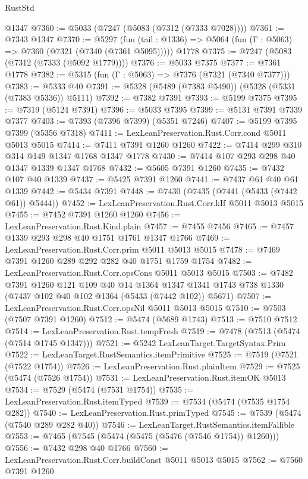 \begin{lexlean}{RustStd}
\begin{coremodule}
    @1347
@7360 := @5033 (@7247 (@5083 (@7312 (@7333 @7028))))
@7361 := @7343 @1347
@7370 := @5297
    (fun (tail : @1336) => @5064 (fun (Γ : @5063) => @7360 (@7321 (@7340 (@7361 @5095)))))
    @1778
@7375 := @7247 (@5083 (@7312 (@7333 (@5092 @1779))))
@7376 := @5033 @7375
@7377 := @7361 @1778
@7382 := @5315 (fun (Γ : @5063) => @7376 (@7321 (@7340 @7377)))
@7383 := @5333 @40
@7391 := @5328 (@5489 (@7383 @5490)) (@5328 (@5331 (@7383 @5336)) @5111)
@7392 := @7382 @7391
@7393 := @5199 @7375
@7395 := @7319 (@5124 @7391)
@7396 := @5033 @7395
@7399 := @5131 @7391 @7339 @7377
@7403 := @7393 (@7396 @7399) (@5351 @7246)
@7407 := @5199 @7395 @7399 (@5356 @7318)
@7411 := LexLeanPreservation.Rust.Corr.cond @5011 @5013 @5015
@7414 := @7411 @7391 @1260 @1260
@7422 := @7414 @299 @310 @314 @149 @1347 @1768 @1347 @1778
@7430 := @7414 @107 @293 @298 @40 @1347 @1339 @1347 @1768
@7432 := @5605 @7391 @1260
@7435 := @7432 @107 @40 @1339
@7437 := @5425 @7391 @1260
@7441 := @7437 @61 @40 @61 @1339
@7442 := @5434 @7391
@7448 := @7430 (@7435 (@7441 (@5433 (@7442 @61)) @5444))
@7452 := LexLeanPreservation.Rust.Corr.kIf @5011 @5013 @5015
@7455 := @7452 @7391 @1260 @1260
@7456 := LexLeanPreservation.Rust.Kind.plain
@7457 := @7455 @7456
@7465 := @7457 @1339 @293 @298 @40 @1751 @1761 @1347 @1766
@7469 := LexLeanPreservation.Rust.Corr.prim @5011 @5013 @5015
@7478 := @7469 @7391 @1260 @289 @292 @282 @40 @1751 @1759 @1754
@7482 := LexLeanPreservation.Rust.Corr.opsCons @5011 @5013 @5015
@7503 := @7482
    @7391
    @1260
    @121
    @109
    @40
    @14
    @1364
    @1347
    @1341
    @1743
    @738
    @1330
    (@7437 @102 @40 @102 @1364 (@5433 (@7442 @102)) @5671)
@7507 := LexLeanPreservation.Rust.Corr.opsNil @5011 @5013 @5015
@7510 := @7503 (@7507 @7391 @1260)
@7512 := @5474 (@5689 @1743)
@7513 := @7510 @7512
@7514 := LexLeanPreservation.Rust.tempFresh
@7519 := @7478 (@7513 (@5474 (@7514 @1745 @1347)))
@7521 := @5242 LexLeanTarget.TargetSyntax.Prim
@7522 := LexLeanTarget.RustSemantics.itemPrimitive
@7525 := @7519 (@7521 (@7522 @1754))
@7526 := LexLeanPreservation.Rust.plainItem
@7529 := @7525 (@5474 (@7526 @1754))
@7531 := LexLeanPreservation.Rust.itemOK @5013
@7534 := @7529 (@5474 (@7531 @1754))
@7535 := LexLeanPreservation.Rust.itemTyped
@7539 := @7534 (@5474 (@7535 @1754 @282))
@7540 := LexLeanPreservation.Rust.primTyped
@7545 := @7539 (@5474 (@7540 @289 @282 @40))
@7546 := LexLeanTarget.RustSemantics.itemFallible
@7553 := @7465 (@7545 (@5474 (@5475 (@5476 (@7546 @1754)) @1260)))
@7556 := @7432 @298 @40 @1766
@7560 := LexLeanPreservation.Rust.Corr.buildConst @5011 @5013 @5015
@7562 := @7560 @7391 @1260

\end{coremodule}
\end{lexlean}
